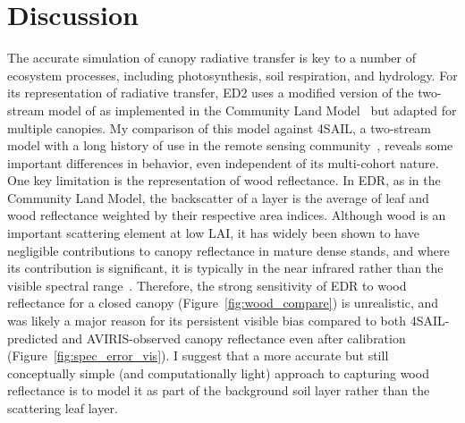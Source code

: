 \section{Discussion}

The accurate simulation of canopy radiative transfer is key to a number of ecosystem processes, including photosynthesis, soil respiration, and hydrology.
For its representation of radiative transfer, ED2 uses a modified version of the two-stream model of \citet{sellers1985canopy} as implemented in the Community Land Model~\citep{clm45_note} but adapted for multiple canopies.
My comparison of this model against 4SAIL, a two-stream model with a long history of use in the remote sensing community~\citep{jacquemoud2009prospect}, reveals some important differences in behavior, even independent of its multi-cohort nature.
One key limitation is the representation of wood reflectance.
In EDR, as in the Community Land Model, the backscatter of a layer is the average of leaf and wood reflectance weighted by their respective area indices.
Although wood is an important scattering element at low LAI, it has widely been shown to have negligible contributions to canopy reflectance in mature dense stands, and where its contribution is significant, it is typically in the near infrared rather than the visible spectral range~\citep{asner_1998_biophysical,malenovsky_2008_influence,verrelst_2010_effects}.
Therefore, the strong sensitivity of EDR to wood reflectance for a closed canopy (Figure~\ref{fig:wood_compare}) is unrealistic,
and was likely a major reason for its persistent visible bias compared to both 4SAIL-predicted and AVIRIS-observed canopy reflectance even after calibration (Figure~\ref{fig:spec_error_vis}).
I suggest that a more accurate but still conceptually simple (and computationally light) approach to capturing wood reflectance is to model it as part of the background soil layer rather than the scattering leaf layer.

